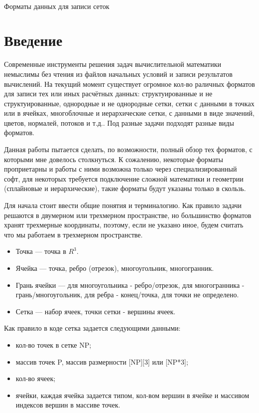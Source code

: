 \documentclass[a4paper,12pt]{article}
\begin{document}
{~}\bigskip
\begin{center}
\Huge{Форматы данных для записи сеток}
\end{center}


\section{Введение}
Современные инструменты решения задач вычислительной математики немыслимы без чтения из файлов начальных условий и записи результатов вычислений. На текущий момент существует огромное кол-во раличных форматов для записи тех или иных расчётных данных: структуированные и не структуированные, однородные и не однородные сетки, сетки с данными в точках или в ячейках, многоблочные и иерархические сетки, с данными в виде значений, цветов, нормалей, потоков и т.д.. Под разные задачи подходят разные виды форматов.

Данная работы пытается сделать, по возможности, полный обзор тех форматов, с которыми мне довелось столкнуться. К сожалению, некоторые форматы проприетарны и работы с ними возможна только через специализированный софт, для некоторых требуется подключение сложной математики и геометрии (сплайновые и иерархические), такие форматы будут указаны только в скользь.

Для начала стоит ввести общие понятия и терминалогию. Как правило задачи решаются в двумерном или трехмерном пространстве, но большинство форматов хранят трехмерные координаты, поэтому, если не указано иное, будем считать что мы работаем в трехмерном пространстве.

\begin{itemize}
\item Точка --- точка в $R^3$.
\item Ячейка --- точка, ребро (отрезок), многоугольник, многогранник.
\item Грань ячейки --- для многоугольника - ребро/отрезок, для многогранника - грань/многоугольник, для ребра - конец/точка, для точки не определено.
\item Сетка --- набор ячеек, точки сетки - вершины ячеек.
\end{itemize}

Как правило в коде сетка задается следующими данными:
\begin{itemize}
\item кол-во точек в сетке NP;
\item массив точек P, массив размерности [NP][3] или [NP*3];
\item кол-во ячеек;
\item ячейки, каждая ячейка задается типом, кол-вом вершин в ячейке и массивом индексов вершин в массиве точек.
\end{itemize}
\end{document}
